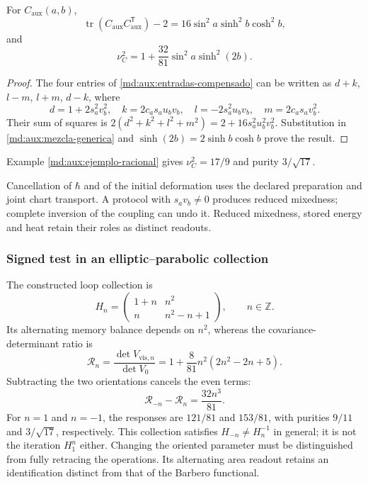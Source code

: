 \begin{corollary}
\label{md:aux:cor-mezcla}
For $C_{\mathrm{aux}}(a,b)$,
\begin{equation}
 \operatorname{tr}(C_{\mathrm{aux}}C_{\mathrm{aux}}^{\mathsf T})-2
 =16\sin^2a\sinh^2b\cosh^2b,
 \label{md:aux:traza-cuadratica}
\end{equation}
and
\begin{equation}
 \boxed{\nu_C^2=1+\frac{32}{81}\sin^2a\sinh^2(2b).}
 \label{md:aux:mezcla-compensado}
\end{equation}
\end{corollary}
\begin{proof}
The four entries of \eqref{md:aux:entradas-compensado} can be
written as $d+k$, $l-m$, $l+m$, $d-k$, where
\[
 d=1+2s_a^2v_b^2,\quad k=2c_as_au_bv_b,\quad
 l=-2s_a^2u_bv_b,\quad m=2c_as_av_b^2.
\]
Their sum of squares is
$2(d^2+k^2+l^2+m^2)=2+16s_a^2u_b^2v_b^2$.
Substitution in \eqref{md:aux:mezcla-generica} and
$\sinh(2b)=2\sinh b\cosh b$ prove the result.
\end{proof}
Example \eqref{md:aux:ejemplo-racional} gives
$\nu_C^2=17/9$ and purity $3/\sqrt{17}$.

Cancellation of $\hbar$ and of the initial deformation uses the
declared preparation and joint chart transport.
A protocol with $s_av_b\ne0$ produces reduced mixedness; complete
inversion of the coupling can undo it. Reduced mixedness, stored
energy and heat retain their roles as distinct readouts.

\subsubsection{Signed test in an elliptic--parabolic collection}
\label{md:aux:familia-hn}

The constructed loop collection is
\begin{equation}
 H_n=\begin{pmatrix}1+n&n^2\\n&n^2-n+1\end{pmatrix},
 \qquad n\in\mathbb Z.
 \label{md:aux:hn}
\end{equation}
Its alternating memory balance depends on $n^2$, whereas the
covariance-determinant ratio is
\begin{equation}
 \mathcal R_n=\frac{\det V_{\mathrm{vis},n}}{\det V_0}
 =1+\frac8{81}n^2(2n^2-2n+5).
 \label{md:aux:covarianza-hn}
\end{equation}
Subtracting the two orientations cancels the even terms:
\begin{equation}
 \boxed{\mathcal R_{-n}-\mathcal R_n=\frac{32n^3}{81}.}
 \label{md:aux:diferencia-direccional}
\end{equation}
For $n=1$ and $n=-1$, the responses are $121/81$ and $153/81$,
with purities $9/11$ and $3/\sqrt{17}$, respectively.
This collection satisfies $H_{-n}\ne H_n^{-1}$ in general;
it is not the iteration $H_1^n$ either. Changing the oriented
parameter must be distinguished from fully retracing the operations.
Its alternating area readout retains an identification distinct
from that of the Barbero functional.

